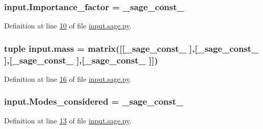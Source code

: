 \hypertarget{namespaceinput_a0840d963ea24db338f3ab4457defb494}{}
\subsubsection[{Importance\+\_\+factor}]{\setlength{\rightskip}{0pt plus 5cm}input.\+Importance\+\_\+factor = \+\_\+sage\+\_\+const\+\_}\label{namespaceinput_a0840d963ea24db338f3ab4457defb494}


Definition at line \hyperlink{input_8sage_8py_source_l00010}{10} of file \hyperlink{input_8sage_8py_source}{input.\+sage.\+py}.

\hypertarget{namespaceinput_af91e2c1a9ecd07a9c8dcf3a5fc8b2b60}{}
\subsubsection[{mass}]{\setlength{\rightskip}{0pt plus 5cm}tuple input.\+mass = matrix(\mbox{[}\mbox{[}\+\_\+sage\+\_\+const\+\_ \mbox{]},\mbox{[}\+\_\+sage\+\_\+const\+\_ \mbox{]},\mbox{[}\+\_\+sage\+\_\+const\+\_ \mbox{]},\mbox{[}\+\_\+sage\+\_\+const\+\_ \mbox{]}\mbox{]})}\label{namespaceinput_af91e2c1a9ecd07a9c8dcf3a5fc8b2b60}


Definition at line \hyperlink{input_8sage_8py_source_l00016}{16} of file \hyperlink{input_8sage_8py_source}{input.\+sage.\+py}.

\hypertarget{namespaceinput_adb7aca4735796aaa4a46456d3edeac2e}{}
\subsubsection[{Modes\+\_\+considered}]{\setlength{\rightskip}{0pt plus 5cm}input.\+Modes\+\_\+considered = {\bf \+\_\+sage\+\_\+const\+\_}}\label{namespaceinput_adb7aca4735796aaa4a46456d3edeac2e}


Definition at line \hyperlink{input_8sage_8py_source_l00013}{13} of file \hyperlink{input_8sage_8py_source}{input.\+sage.\+py}.

\hypertarget{namespaceinput_a10237b312ba44e8c8090db86059c5803}{}
